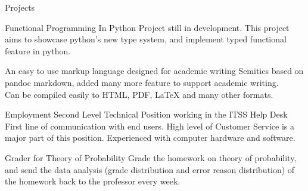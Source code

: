 \documentclass[]{resume-knyte}
\begin{document}
\newpage

\begin{topic}{Projects}


    {Functional Programming In Python}
    {Project still in development.
    This project aims to showcase python's new type system, and implement typed functional feature in python.}

    {An easy to use markup language designed for academic writing}
    {Semitics based on pandoc markdown, added many more feature to support academic writing.\\
    Can be compiled easily to HTML, PDF, \LaTeX{} and many other formats.}
    \\

\end{topic}


\begin{topic}{Employment}
    {Second Level Technical Position working in the ITSS Help Desk}
    {First line of communication with end users.
    High level of Customer Service is a major part of this position.
    Experienced with computer hardware and software.}

    {Grader for Theory of Probability}
    {Grade the homework on theory of probability,
    and send the data analysis (grade distribution and error reason distribution)
    of the homework back to the professor every week.}
\end{topic}
\end{document}
